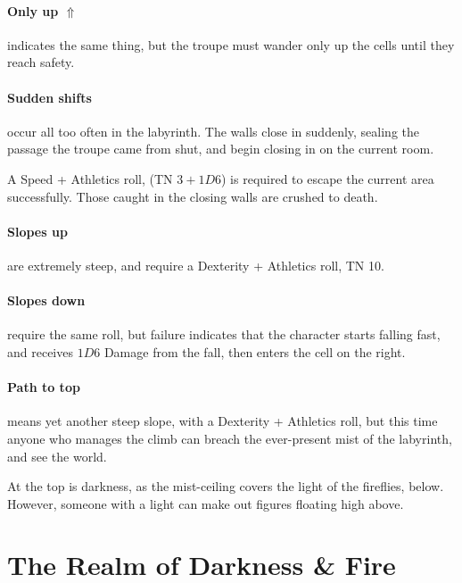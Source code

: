 \begin{multicols}{2}
\paragraph{Only up $\Uparrow$}
indicates the same thing, but the troupe must wander only up the cells until they reach safety.

\paragraph{Sudden shifts}
occur all too often in the labyrinth.
The walls close in suddenly, sealing the passage the troupe came from shut, and begin closing in on the current room.

A Speed + Athletics roll, (TN $3 + 1D6$)
is required to escape the current area successfully.
Those caught in the closing walls are crushed to death.

\paragraph{Slopes up}
are extremely steep, and require a Dexterity + Athletics roll, TN 10.

\paragraph{Slopes down}
require the same roll, but failure indicates that the character starts falling fast, and receives $1D6$ Damage from the fall, then enters the cell on the right.

\paragraph{Path to top}
means yet another steep slope, with a Dexterity + Athletics roll, but this time anyone who manages the climb can breach the ever-present mist of the labyrinth, and see the world.

At the top is darkness, as the mist-ceiling covers the light of the fireflies, below.
However, someone with a light can make out figures floating high above.

\end{multicols}

\section{The Realm of Darkness \& Fire}\label{darknessandfire}

